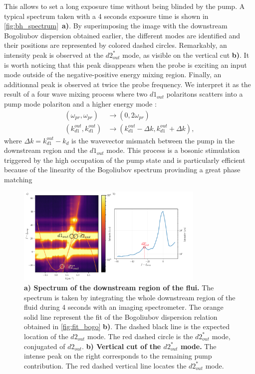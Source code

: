 This allows to set a long exposure time without being blinded by the pump. A typical spectrum taken with a 4 seconds exposure time is shown in \autoref{fig:bh_spectrum}~\textbf{a)}. By superimposing the image with the downstream Bogoliubov dispersion obtained earlier, the different modes are identified and their positions 
are represented by colored dashed circles. Remarkably, an intensity peak is observed at the $d2_{out}^*$ mode, as visible on the vertical cut \textbf{b)}. It is worth noticing that this peak disappears when the probe 
is exciting an input mode outside of the negative-positive energy mixing region. Finally, an additionnal peak is observed at twice the probe frequency. We interpret it 
as the result of a four wave mixing process where two $d1_{out}$ polaritons scatters into a pump mode polariton and a higher energy mode :
\begin{equation}
    \begin{aligned}
    (\omega_{pr}, \omega_{pr}) &\to (0, 2\omega_{pr}) \\
    (k_{d1}^{out}, k_{d1}^{out}) &\to (k_{d1}^{out}-\Delta k,k_{d1}^{out}+\Delta k),
    \end{aligned}
    \label{eq:higher_order_four_wave_mixing}
\end{equation}
where $\Delta k= k_{d1}^{out}-k_d$ is the wavevector mismatch between the pump in the downstream region and the $d1_{out}$ mode. This process is a bosonic stimulation triggered by the high 
occupation of the pump state and is particularly efficient because of the linearity of the Bogoliubov spectrum provinding a great phase matching 


\begin{figure}
    \centering
    \includegraphics[width=0.8\textwidth]{chap_stimulated_hawking/fig/disp_supersonic_spectro.pdf}
    \caption{\textbf{a) Spectrum of the downstream region of the flui.} The spectrum is taken by integrating the whole downstream region of the fluid during 4 seconds
    with an imaging spectrometer. The orange solid line represent the fit of the Bogoliubov dispersion relation obtained in \autoref{fig:fit_bogo} \textbf{b)}. The dashed black line is the expected location of the $d2_{out}$ mode.
    The red dashed circle is the $d2_{out}^*$ mode, conjugated of $d2_{out}$. 
    \textbf{b) Vertical cut of the $d2_{out}^*$ mode.} The intense peak on the right corresponds to the remaining pump contribution. The red dashed vertical line locates the $d2_{out}^*$ mode.}
    \label{fig:spectrum_spectro}
\end{figure}
\bigskip

